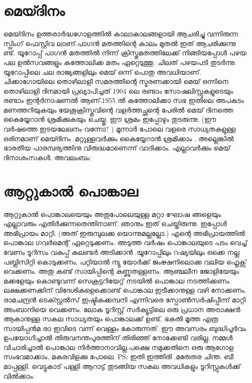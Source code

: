 \documentclass[10pt,a4paper]{report}
\begin{document}
    \section{ മെയ്ദിനം}
    മെയ്ദിനം ഉത്തരാർദ്ധഗോളത്തിൽ കാലാകാലങ്ങളായി ആചരിച്ചു വന്നിരുന്ന സ്പ്രിംഗ് ഫെസ്റ്റിവ ലാണ്.പാഗൻ മതത്തിന്റെ കാലം മുതൽ ഇത് ആചരിക്കുന്നു ണ്ട്. യൂറോപ്പ് പാഗൻ മതത്തിൽ നിന്ന് ക്രിസ്തുമതത്തിലേക്ക് നിങ്ങിയപ്പോൾ പഴയ പല ഉൽസവങ്ങളും കത്തോലിക്ക മതം ഏറ്റെടുത്തു. ചിലത് പഴയപടി തുടർന്നു. യൂറോപ്പിലെ ചല രാജ്യങ്ങളിലും മെയ് ഒന്ന് പൊതു അവധിയാണ്. ചിക്കാഗോയിലെ തൊഴിലാളി സമരത്തിന്റെ സ്മരണക്കായി മെയ് ഒന്നിനെ തൊഴിലാളി ദിനമായി പ്രഖ്യാപിച്ചത് 1904 ലെ രണ്ടാം സോഷലിസ്റ്റുകളുടെയും രണ്ടാം ഇന്റർനാഷണൽ ആണ്.1955 ൽ കത്തോലിക്കാ സഭ ഇതിലെ അപകടം മണത്തറിയുകയും യേശുക്രിസ്തുവിന്റെ വളർത്തച്ഛന്റെ പേരിൽ മെയ് ദിനത്തെ കൈയ്യേറാൻ ശ്രമിക്കുകയും ചെയ്തു. ഈ ശ്രമം ഇപ്പോഴും തുടരുന്നു. (ഈ വർഷത്തെ ഇടയലേഖനം വന്നോ? ) മൂന്നാർ പോലെ വളരെ സാധ്യതകളുള്ള ഒരിനമാണ് മെയ്ദിനം .മറ്റുള്ളവർക്കും കൈയ്യേറാൻ ശ്രമിക്കാം . അല്ലെങ്കിൽ ഭാരതീയ പാരമ്പര്യത്തിനു വിരുദ്ധമാണെന്ന് വാദിക്കാം. എല്ലാവർക്കും മെയ് ദിനാശംസകൾ. അവലംബം: 
    
    
    
    \section{   ആറ്റുകാൽ പൊങ്കാല
    }
    ആറ്റുകാൽ പൊങ്കാലയെയും അതുപോലെയുള്ള മറ്റാ ഘോഷ ങ്ങളെയും എല്ലാവരും എതിർക്കുന്നതെന്തിനാണ്. ഞാനും ഇത് ചെയ്തിരുന്നു. ഇപ്പോൾ അഭിപ്രായം മാറ്റി. (അത് ഇരുമ്പുലക്ക യൊന്നുമല്ലല്ലോ.) എന്റെ അഭിപ്രായത്തിൽ പൊങ്കാല ഗവർമെന്റ് ഏറ്റെടുക്കണം. അടുത്ത വർഷം പൊങ്കാലയുടെ പടം വെച്ച് വേണം ടൂറിസം വകുപ്പ് കലണ്ടർ അടിക്കാൻ .യൂറോപ്പിലും റഷ്യയിലും ഒക്കെ നല്ല പബ്ലിസിറ്റി കൊടുക്കണം. പറ്റിയാൽ ന്യു യോർക്ക് ജംങ്ക്ഷനിലൊക്ക വലിയ ഫ്ലെക്സ് വെക്കണം. അതു കണ്ട് സായിപ്പിന്റെ കണ്ണുതള്ളണം. ആഞ്ചലീന ജോളിയേയും മക്കളേയും കൊണ്ടുവന്ന് സെക്രട്ടറിയേറ്റ് നടയിൽ പൊങ്കാല നടത്തിക്കണം. ലക്ഷക്കണക്കിന് വിദേശികളെക്കൊണ്ട് പൊങ്കാല ഇടീക്കാനുള്ള വഴി നോക്കണം. രാമചന്ദ്രൻ ടെക്സ്റ്റൽസ് ഇഷ്ടികക്കമ്പനി എന്നിവരെ സ്പോൺസർഷിപ്പീന്ന് മാറ്റി അംബാനിയെ വെക്കണം. ലോക ടൂറിസ്റ്റ് സർക്യൂട്ടിലെ ഒരു പ്രധാന അട്രാക്ഷൻ ആകാനുള്ള സകല സാധ്യതയും പൊങ്കാലക്ക് ഉണ്ട്. ഭകതി മൂത്ത എത്ര സായിപ്പൻമ രാ ഇവിടെ വന്ന് വെള്ളം കോരുന്നത്. ഈ അവസരം ബുദ്ധിപൂർവം ഉപയോഗിച്ചാൽ തിരുവനന്തപുരത്തിന് തിരിഞ്ഞ് നോക്കേണ്ടി വരില്ല. നമ്മൾ വിചാരിച്ചാൽ പൊങ്കാല നിർത്താനാവില്ല.പക്ഷെ നമുക്കതിനെ ഒരു ആഗോള സംഭവമാക്കാം, മകരവിളക്കു പോലെ. PS: ഇതി ഇത്തിരി .മതേതര ചിന്ത. ബീ മാപ്പള്ളി. വെട്ടുകാട് പള്ളി ആറാട്ട് തുടങ്ങിയ സകല അവധികളും ടൂറിസ്റ്റുകൾക്ക് വിൽക്കാം.
    
  
\end{document}
